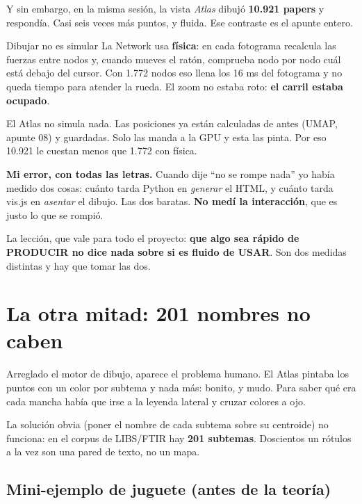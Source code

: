 \documentclass[11pt,a4paper]{article}
\begin{document}
Y sin embargo, en la misma sesión, la vista \emph{Atlas} dibujó \textbf{10.921 papers} y
respondía. Casi seis veces más puntos, y fluida. Ese contraste es el apunte entero.

\begin{concepto}{Dibujar no es simular}
La Network usa \textbf{física}: en cada fotograma recalcula las fuerzas entre nodos y,
cuando mueves el ratón, comprueba nodo por nodo cuál está debajo del cursor. Con 1.772
nodos eso llena los 16 ms del fotograma y no queda tiempo para atender la rueda. El zoom
no estaba roto: \textbf{el carril estaba ocupado}.

El Atlas no simula nada. Las posiciones ya están calculadas de antes (UMAP, apunte 08) y
guardadas. Solo las manda a la GPU y esta las pinta. Por eso 10.921 le cuestan menos que
1.772 con física.
\end{concepto}

\begin{ojo}
\textbf{Mi error, con todas las letras.} Cuando dije ``no se rompe nada'' yo había medido dos cosas: cuánto tarda Python en
\emph{generar} el HTML, y cuánto tarda vis.js en \emph{asentar} el dibujo. Las dos
baratas. \textbf{No medí la interacción}, que es justo lo que se rompió.

La lección, que vale para todo el proyecto: \textbf{que algo sea rápido de PRODUCIR no
dice nada sobre si es fluido de USAR}. Son dos medidas distintas y hay que tomar las dos.
\end{ojo}

\section{La otra mitad: 201 nombres no caben}

Arreglado el motor de dibujo, aparece el problema humano. El Atlas pintaba los puntos con
un color por subtema y nada más: bonito, y mudo. Para saber qué era cada mancha había que
irse a la leyenda lateral y cruzar colores a ojo.

La solución obvia (poner el nombre de cada subtema sobre su centroide) no funciona:
en el corpus de LIBS/FTIR hay \textbf{201 subtemas}. Doscientos un rótulos a la vez son
una pared de texto, no un mapa.

\subsection{Mini-ejemplo de juguete (antes de la teoría)}
\end{document}
